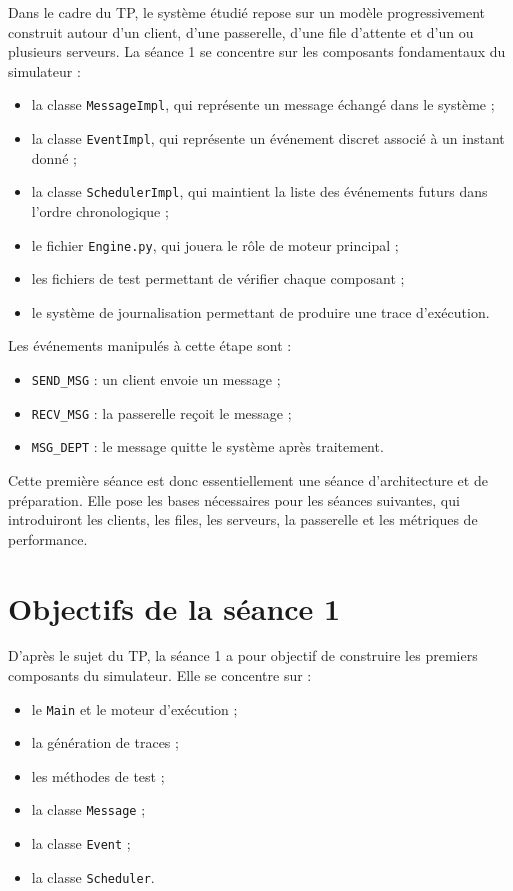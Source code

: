 \documentclass{article}
\begin{document}
Dans le cadre du TP, le système étudié repose sur un modèle progressivement construit autour d’un client, d’une passerelle, d’une file d’attente et d’un ou plusieurs serveurs. La séance 1 se concentre sur les composants fondamentaux du simulateur :
\begin{itemize}[leftmargin=*]
    \item la classe \texttt{MessageImpl}, qui représente un message échangé dans le système ;
    \item la classe \texttt{EventImpl}, qui représente un événement discret associé à un instant donné ;
    \item la classe \texttt{SchedulerImpl}, qui maintient la liste des événements futurs dans l’ordre chronologique ;
    \item le fichier \texttt{Engine.py}, qui jouera le rôle de moteur principal ;
    \item les fichiers de test permettant de vérifier chaque composant ;
    \item le système de journalisation permettant de produire une trace d’exécution.
\end{itemize}

Les événements manipulés à cette étape sont :
\begin{itemize}[leftmargin=*]
    \item \texttt{SEND\_MSG} : un client envoie un message ;
    \item \texttt{RECV\_MSG} : la passerelle reçoit le message ;
    \item \texttt{MSG\_DEPT} : le message quitte le système après traitement.
\end{itemize}

Cette première séance est donc essentiellement une séance d’architecture et de préparation. Elle pose les bases nécessaires pour les séances suivantes, qui introduiront les clients, les files, les serveurs, la passerelle et les métriques de performance.

\section{Objectifs de la séance 1}
D’après le sujet du TP, la séance 1 a pour objectif de construire les premiers composants du simulateur. Elle se concentre sur :
\begin{itemize}[leftmargin=*]
    \item le \texttt{Main} et le moteur d’exécution ;
    \item la génération de traces ;
    \item les méthodes de test ;
    \item la classe \texttt{Message} ;
    \item la classe \texttt{Event} ;
    \item la classe \texttt{Scheduler}.
\end{itemize}
\end{document}
